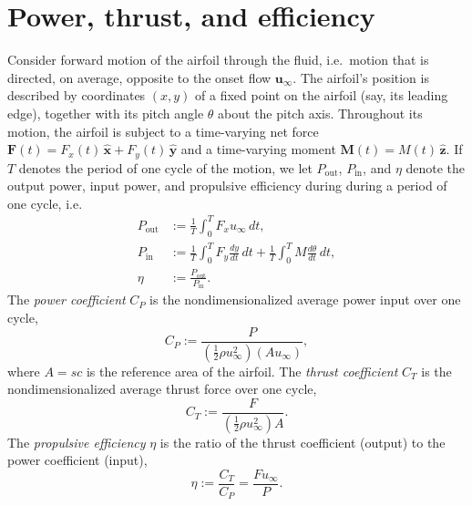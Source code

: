 \documentclass[10pt,fleqn,reqno]{article}
\newcommand\ie{i.e.~}
\newcommand\defn[1]{\emph{#1}}
\newcommand\od[2]{\frac{d#1}{d#2}}
\begin{document}
\section{Power, thrust, and efficiency}
Consider forward motion of the airfoil through the fluid, \ie motion that is directed, on average, opposite to the onset flow $\mathbf u_\infty$.  The airfoil's position is described by coordinates $(x,y)$ of a fixed point on the airfoil (say, its leading edge), together with its pitch angle $\theta$ about the pitch axis.  Throughout its motion, the airfoil is subject to a time-varying net force $\mathbf F(t)=F_x(t)\,\hat{\mathbf x}+F_y(t)\,\hat{\mathbf y}$ and a time-varying moment $\mathbf M(t)=M(t)\,\hat{\mathbf z}$.  If $T$ denotes the period of one cycle of the motion, we let $P_\text{out}$, $P_\text{in}$, and $\eta$ denote the output power, input power, and propulsive efficiency during during a period of one cycle, \ie
\begin{align*}
P_\text{out} &:= \frac{1}{T}\int_0^T F_xu_\infty\,dt,\\
P_\text{in} &:= \frac{1}{T}\int_0^T F_y\od{y}{t}\,dt+\frac{1}{T}\int_0^TM\od{\theta}{t}\,dt,\\
\eta &:= \frac{P_\text{out}}{P_\text{in}}.
\end{align*}
The \defn{power coefficient} $C_P$ is the nondimensionalized average power input over one cycle, \[C_P:=\frac{P}{(\frac{1}{2}\rho u_\infty^2)(Au_\infty)},\] where $A=sc$ is the reference area of the airfoil.  The \defn{thrust coefficient} $C_T$ is the nondimensionalized average thrust force over one cycle, \[C_T:=\frac{F}{(\frac{1}{2}\rho u_\infty^2)A}.\]  The \defn{propulsive efficiency} $\eta$ is the ratio of the thrust coefficient (output) to the power coefficient (input), \[\eta:=\frac{C_T}{C_P}=\frac{Fu_\infty}{P}.\]
\end{document}
